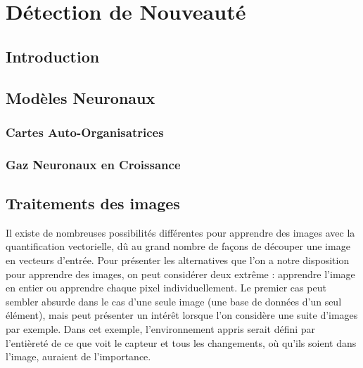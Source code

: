 
\chapter{Détection de Nouveauté}
	\minitoc
	\newpage




			
	\section{Introduction}
	\section{Modèles Neuronaux}
	\subsection{Cartes Auto-Organisatrices}
	\subsection{Gaz Neuronaux en Croissance}

	\newpage
	\section{Traitements des images}\label{sec:images}

	Il existe de nombreuses possibilités différentes pour apprendre des images avec la quantification vectorielle, dû au grand nombre de façons de découper une image en vecteurs d'entrée. Pour présenter les alternatives que l'on a notre disposition pour apprendre des images, on peut considérer deux extrême : apprendre l'image en entier ou apprendre chaque pixel individuellement. Le premier cas peut sembler absurde dans le cas d'une seule image (une base de données d'un seul élément), mais peut présenter un intérêt lorsque l'on considère une suite d'images par exemple. Dans cet exemple, l'environnement appris serait défini par l'entièreté de ce que voit le capteur et tous les changements, où qu'ils soient dans l'image, auraient de l'importance.

